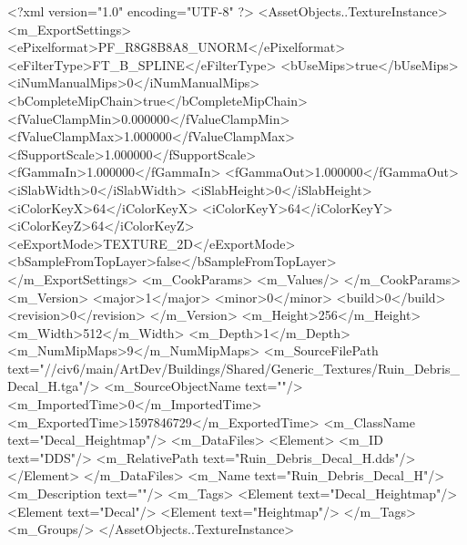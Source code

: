 <?xml version="1.0" encoding="UTF-8" ?>
<AssetObjects..TextureInstance>
	<m_ExportSettings>
		<ePixelformat>PF_R8G8B8A8_UNORM</ePixelformat>
		<eFilterType>FT_B_SPLINE</eFilterType>
		<bUseMips>true</bUseMips>
		<iNumManualMips>0</iNumManualMips>
		<bCompleteMipChain>true</bCompleteMipChain>
		<fValueClampMin>0.000000</fValueClampMin>
		<fValueClampMax>1.000000</fValueClampMax>
		<fSupportScale>1.000000</fSupportScale>
		<fGammaIn>1.000000</fGammaIn>
		<fGammaOut>1.000000</fGammaOut>
		<iSlabWidth>0</iSlabWidth>
		<iSlabHeight>0</iSlabHeight>
		<iColorKeyX>64</iColorKeyX>
		<iColorKeyY>64</iColorKeyY>
		<iColorKeyZ>64</iColorKeyZ>
		<eExportMode>TEXTURE_2D</eExportMode>
		<bSampleFromTopLayer>false</bSampleFromTopLayer>
	</m_ExportSettings>
	<m_CookParams>
		<m_Values/>
	</m_CookParams>
	<m_Version>
		<major>1</major>
		<minor>0</minor>
		<build>0</build>
		<revision>0</revision>
	</m_Version>
	<m_Height>256</m_Height>
	<m_Width>512</m_Width>
	<m_Depth>1</m_Depth>
	<m_NumMipMaps>9</m_NumMipMaps>
	<m_SourceFilePath text="//civ6/main/ArtDev/Buildings/Shared/Generic_Textures/Ruin_Debris_Decal_H.tga"/>
	<m_SourceObjectName text=""/>
	<m_ImportedTime>0</m_ImportedTime>
	<m_ExportedTime>1597846729</m_ExportedTime>
	<m_ClassName text="Decal_Heightmap"/>
	<m_DataFiles>
		<Element>
			<m_ID text="DDS"/>
			<m_RelativePath text="Ruin_Debris_Decal_H.dds"/>
		</Element>
	</m_DataFiles>
	<m_Name text="Ruin_Debris_Decal_H"/>
	<m_Description text=""/>
	<m_Tags>
		<Element text="Decal_Heightmap"/>
		<Element text="Decal"/>
		<Element text="Heightmap"/>
	</m_Tags>
	<m_Groups/>
</AssetObjects..TextureInstance>

